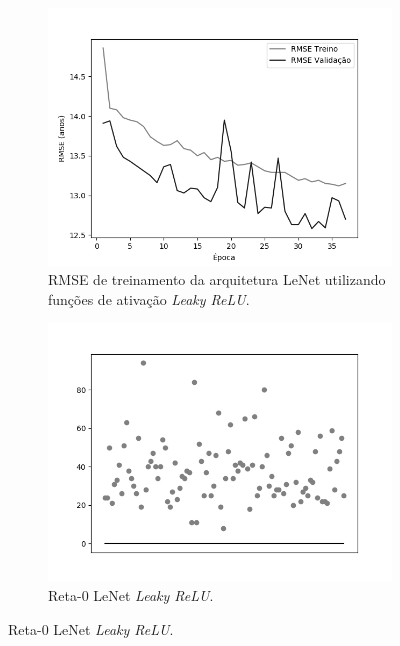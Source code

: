\begin{figure}[hb!]
\begin{subfigure}[hb]{0.5\linewidth}
		\end{subfigure}\\
		\begin{subfigure}[hb]{0.5\linewidth}
			\caption{RMSE de treinamento da arquitetura LeNet utilizando funções de ativação \emph{Leaky ReLU}.}
			\includegraphics[width=\linewidth]{img/graficos/history/lenet/fig-history-image-treat-3-lenet-lrelu-rmse.png}
		\end{subfigure}
		\begin{subfigure}[hb]{0.5\linewidth}
			\caption{Reta-0 LeNet \emph{Leaky ReLU}.}
		 \includegraphics[width=\linewidth]{img/graficos/reta0/lenet/fig-reta-0-image-treat-3-lenet-lrelu.png}
		\end{subfigure}%
	\end{figure}

